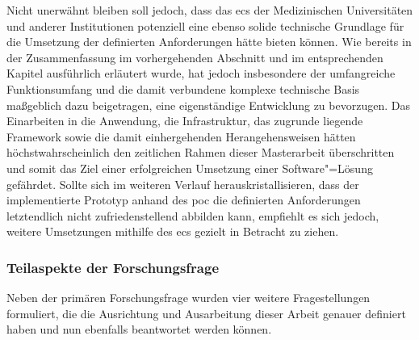 \documentclass[a4paper,12pt,twoside,numbers=noendperiod]{scrreprt}
\begin{document}
Nicht unerwähnt bleiben soll jedoch, dass das \ac{ecs} der Medizinischen Universitäten und anderer Institutionen potenziell eine ebenso solide technische Grundlage für die Umsetzung der definierten Anforderungen hätte bieten können. Wie bereits in der Zusammenfassung im vorhergehenden Abschnitt und im entsprechenden Kapitel ausführlich erläutert wurde, hat jedoch insbesondere der umfangreiche Funktionsumfang und die damit verbundene komplexe technische Basis maßgeblich dazu beigetragen, eine eigenständige Entwicklung zu bevorzugen. Das Einarbeiten in die Anwendung, die Infrastruktur, das zugrunde liegende Framework sowie die damit einhergehenden Herangehensweisen hätten höchstwahrscheinlich den zeitlichen Rahmen dieser Masterarbeit überschritten und somit das Ziel einer erfolgreichen Umsetzung einer Software"=Lösung gefährdet. Sollte sich im weiteren Verlauf herauskristallisieren, dass der implementierte Prototyp anhand des \ac{poc} die definierten Anforderungen letztendlich nicht zufriedenstellend abbilden kann, empfiehlt es sich jedoch, weitere Umsetzungen mithilfe des \acl{ecs} gezielt in Betracht zu ziehen.


\subsubsection*{Teilaspekte der Forschungsfrage}

Neben der primären Forschungsfrage wurden vier weitere Fragestellungen formuliert, die die Ausrichtung und Ausarbeitung dieser Arbeit genauer definiert haben und nun ebenfalls beantwortet werden können.

\medskip
\end{document}
